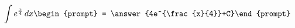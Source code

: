 \documentclass{ximera}
\author{Steven Gubkin}
\begin{document}
\begin{exercise}

\[
\int e^{\frac{x}{4}} \d x \begin{prompt} = \answer{4e^{\frac{x}{4}}+C}\end{prompt}
\]

\end{exercise}
\end{document}
